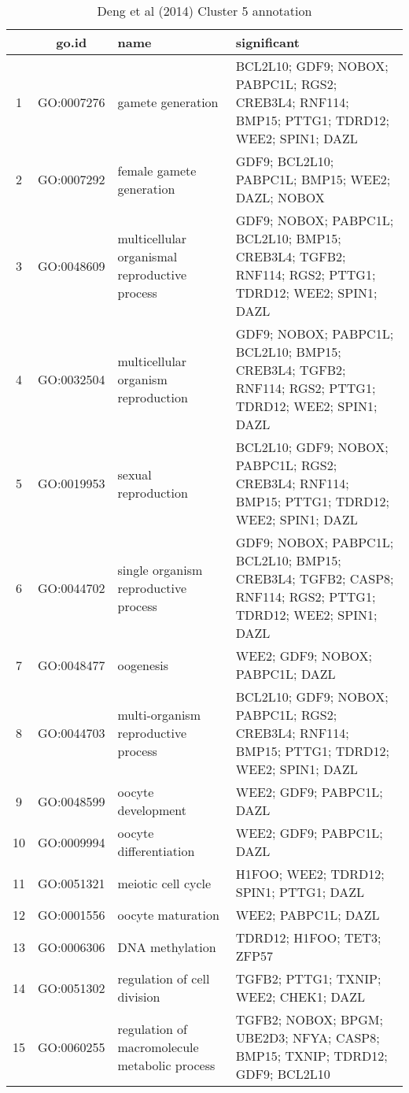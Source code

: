 \begin{table}[htp]
\begin{center}
\caption{Deng et al (2014) Cluster 5 annotation} \label{tab:tab9}
\begin{tabular}{|c|c|p{1.5in}|p{4in}|}
  \hline
 & go.id & name & significant \\ 
  \hline
1 & GO:0007276 & gamete generation & \footnotesize{BCL2L10; GDF9; NOBOX; PABPC1L; RGS2; CREB3L4; RNF114; BMP15; PTTG1; TDRD12; WEE2; SPIN1; DAZL} \\ 
  2 & GO:0007292 & female gamete generation & \footnotesize{GDF9; BCL2L10; PABPC1L; BMP15; WEE2; DAZL; NOBOX} \\ 
  3 & GO:0048609 & multicellular organismal reproductive process & \footnotesize{GDF9; NOBOX; PABPC1L; BCL2L10; BMP15; CREB3L4; TGFB2; RNF114; RGS2; PTTG1; TDRD12; WEE2; SPIN1; DAZL} \\ 
  4 & GO:0032504 & multicellular organism reproduction & \footnotesize{GDF9; NOBOX; PABPC1L; BCL2L10; BMP15; CREB3L4; TGFB2; RNF114; RGS2; PTTG1; TDRD12; WEE2; SPIN1; DAZL}\\ 
  5 & GO:0019953 & sexual reproduction & \footnotesize{BCL2L10; GDF9; NOBOX; PABPC1L; RGS2; CREB3L4; RNF114; BMP15; PTTG1; TDRD12; WEE2; SPIN1; DAZL} \\ 
  6 & GO:0044702 & single organism reproductive process & \footnotesize{GDF9; NOBOX; PABPC1L; BCL2L10; BMP15; CREB3L4; TGFB2; CASP8; RNF114; RGS2; PTTG1; TDRD12; WEE2; SPIN1; DAZL} \\ 
  7 & GO:0048477 & oogenesis & \footnotesize{WEE2; GDF9; NOBOX; PABPC1L; DAZL} \\ 
  8 & GO:0044703 & multi-organism reproductive process & \footnotesize{BCL2L10; GDF9; NOBOX; PABPC1L; RGS2; CREB3L4; RNF114; BMP15; PTTG1; TDRD12; WEE2; SPIN1; DAZL} \\ 
  9 & GO:0048599 & oocyte development  & \footnotesize{WEE2; GDF9; PABPC1L; DAZL} \\ 
  10 & GO:0009994 & oocyte differentiation & \footnotesize{WEE2; GDF9; PABPC1L; DAZL} \\ 
  11 & GO:0051321 & meiotic cell cycle & \footnotesize{H1FOO; WEE2; TDRD12; SPIN1; PTTG1; DAZL} \\ 
  12 & GO:0001556 & oocyte maturation & \footnotesize{WEE2; PABPC1L; DAZL} \\ 
  13 & GO:0006306 & DNA methylation & \footnotesize{TDRD12; H1FOO; TET3; ZFP57} \\ 
  14 & GO:0051302 & regulation of cell division & \footnotesize{TGFB2; PTTG1; TXNIP; WEE2; CHEK1; DAZL} \\ 
  15 & GO:0060255 & regulation of macromolecule metabolic process & \footnotesize{TGFB2; NOBOX; BPGM; UBE2D3; NFYA; CASP8; BMP15; TXNIP; TDRD12; GDF9; BCL2L10} \\ 
 \hline
\end{tabular}
\end{center} \label{tab:tab9}
  \end{table}
\clearpage

